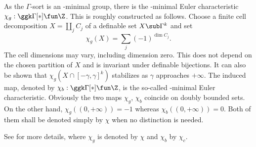 \begin{rem}
As  the  $\Gamma$-sort is an \omin-minimal group, there is  the  \omin-minimal Euler characteristic  $\chi_g : \ggk \Gamma[*] \fun \Z$. This is roughly constructed as follows. {\color{SectionFourProposal}Choose a finite cell decomposition $X=\coprod_j C_j$ of a definable set $X\sub\Gamma^k$ and set
\[
\chi_g(X)=\sum_j(-1)^{\dim C_j}.
\]
The cell dimensions may vary, including dimension zero.}
This does not depend on the chosen partition of $X$ and is invariant under definable bijections. It can also be shown that $\chi_g(X \cap [-\gamma, \gamma]^k)$ stabilizes as $\gamma$ approaches $+\infty$. The induced map, denoted by $\chi_b: \ggk \Gamma[*] \fun \Z$,  is the so-called  \omin-minimal Euler characteristic. Obviously the two maps $\chi_g$, $\chi_b$  coincide on doubly bounded sets. On the other hand,  $\chi_g((0,+\infty))=-1$ whereas $\chi_b((0,+\infty))=0$. Both of them shall be denoted simply by $\chi$ when no distinction is needed.


See \cite[\S~9]{hrushovski:kazhdan:integration:vf} for more details, where $\chi_g$ is denoted by $\chi$ and $\chi_b$ by $\chi_c$.
\end{rem}


